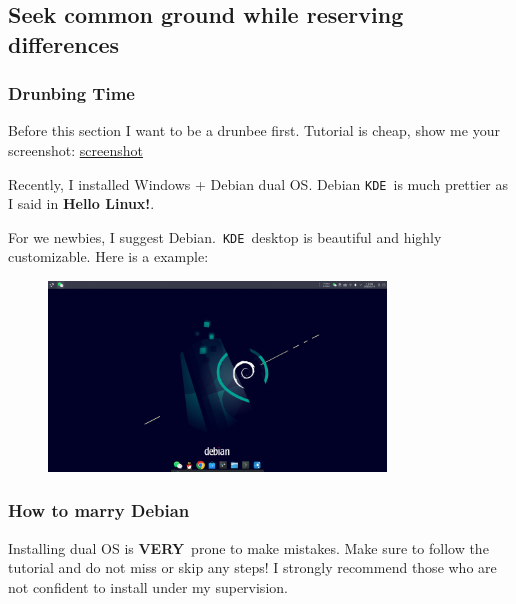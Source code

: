 \documentclass[12pt]{ctexart}
\newenvironment{mdquote}
{%
  \par\noindent
  \begin{list}{}{%
      \setlength{\leftmargin}{1em}%
      \setlength{\rightmargin}{0pt}%
      \setlength{\itemindent}{0pt}%
      \setlength{\listparindent}{\parindent}%
      \setlength{\topsep}{0.5\baselineskip}%
  }
  \item[\textbf{>}\ ]\itshape
}
{\end{list}\par}
\begin{document}
\newpage
\subsection{\textbf{Seek common ground while reserving differences}}

\subsubsection{\textbf{Drunbing Time}}

Before this section I want to be a drunbee first. Tutorial is cheap,
show me your screenshot: \href{https://raw.githubusercontent.com/Octopus058/Introduction-to-Linux/refs/heads/main/assets/Linux/3.1%20Seek%20common%20ground%20while%20reserving%20differences/example.gif}{screenshot}

Recently, I installed Windows + Debian dual OS. Debian \texttt{KDE}\ is
much prettier as I said in \textbf{Hello Linux!}.

\begin{mdquote}
For we newbies, I suggest Debian.\ \texttt{KDE}\ desktop is beautiful and
highly customizable. Here is a example:

\begin{figure}[H]
    \centering
    \includegraphics[width=0.8\textwidth,keepaspectratio]{assets/Linux/3.1 Seek common ground while reserving differences/1.png}
\end{figure}

\end{mdquote}

\subsubsection{\textbf{How to marry Debian}}

\begin{mdquote}
Installing dual OS is \textbf{VERY}\ prone to make mistakes. Make sure to
follow the tutorial and do not miss or skip any steps! I strongly
recommend those who are not confident to install under my supervision.
\end{mdquote}
\end{document}
